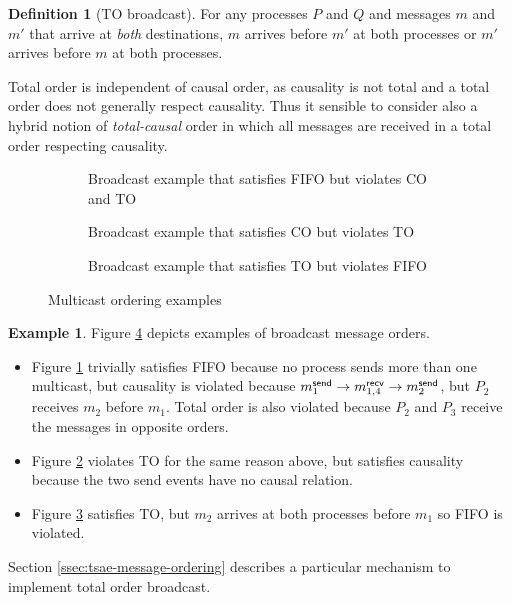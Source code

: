 \documentclass[]             %
{NASA}                       %
\theoremstyle{definition}
\newtheorem{example}[theorem]{Example}
\newtheorem{definition}[theorem]{Definition}
\providecommand{\tightlist}{%
  \setlength{\itemsep}{0pt}\setlength{\parskip}{0pt}}
\begin{document}
\begin{definition}[TO broadcast]
  \label{def:totalorderbroadcast} For any processes $P$ and $Q$ and
  messages $m$ and $m'$ that arrive at \emph{both} destinations, $m$
  arrives before $m'$ at both processes or $m'$ arrives before $m$ at
  both processes.
\end{definition}

Total order is independent of causal order, as causality is not total
and a total order does not generally respect causality. Thus it
sensible to consider also a hybrid notion of \emph{total-causal} order
in which all messages are received in a total order respecting
causality.

\begin{figure}[p]
  \setlength\belowcaptionskip{5ex}
  \begin{subfigure}{1\textwidth}
    \centering
    
    \caption{Broadcast example that satisfies FIFO but violates CO and TO}
    \label{fig:bcast-order-examples-1}
  \end{subfigure}
  \begin{subfigure}{1\textwidth}
    \centering
    
    \caption{Broadcast example that satisfies CO but violates TO}
    \label{fig:bcast-order-examples-2}
  \end{subfigure}
  \begin{subfigure}{1\textwidth}
    \centering
    
    \caption{Broadcast example that satisfies TO but violates FIFO}
    \label{fig:bcast-order-examples-3}
  \end{subfigure}
  \caption{Multicast ordering examples}
  \label{fig:bcast-ordering-examples}
\end{figure}

\begin{example}
Figure \ref{fig:bcast-ordering-examples} depicts examples of broadcast
message orders.
\begin{itemize}
  \tightlist
\item Figure \ref{fig:bcast-order-examples-1} trivially satisfies FIFO
  because no process sends more than one multicast, but causality is
  violated because $m_{1}^{\mathsf{send}} \to m_{1,4}^{\mathsf{recv}} \to m_{2}^{\mathsf{send}}$, but
  $P_2$ receives $m_2$ before $m_1$. Total order is also violated
  because $P_2$ and $P_3$ receive the messages in opposite orders.
\item Figure \ref{fig:bcast-order-examples-2} violates TO for the same
  reason above, but satisfies causality because the two send events
  have no causal relation.
\item Figure \ref{fig:bcast-order-examples-3}
  satisfies TO, but $m_2$ arrives at both processes before $m_1$ so
  FIFO is violated.
\end{itemize}
\end{example}
Section \ref{ssec:tsae-message-ordering} describes a particular
mechanism to implement total order broadcast.
\end{document}

